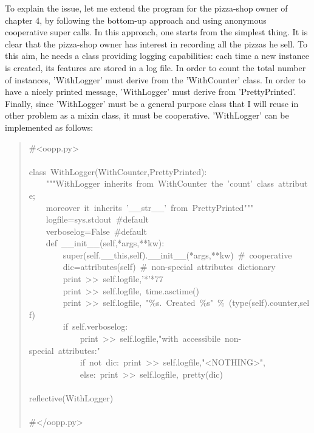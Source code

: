 \documentclass[10pt,english]{article}
\begin{document}
To explain the issue, let me extend the program for the pizza-shop owner of
chapter 4, by following the bottom-up approach and using anonymous
cooperative super calls.
In this approach, one starts from the simplest thing. 
It is clear that the pizza-shop owner has interest in recording all the 
pizzas he sell. 
To this aim, he needs a class providing logging capabilities: 
each time a new instance is created, its features are stored in a log file. In
order to count the total number of instances, 'WithLogger' must derive from
the 'WithCounter' class. In order to have a nicely printed message,
'WithLogger' must derive from 'PrettyPrinted'. Finally, 
since 'WithLogger' must be a general purpose 
class that I will reuse in other problem as a mixin class, it must be 
cooperative. 'WithLogger' can be implemented as follows:
\begin{quote}
\begin{ttfamily}\begin{flushleft}
\mbox{{\#}<oopp.py>}\\
\mbox{}\\
\mbox{class~WithLogger(WithCounter,PrettyPrinted):}\\
\mbox{~~~~"""WithLogger~inherits~from~WithCounter~the~'count'~class~attribute;~}\\
\mbox{~~~~moreover~it~inherits~'{\_}{\_}str{\_}{\_}'~from~PrettyPrinted"""}\\
\mbox{~~~~logfile=sys.stdout~{\#}default}\\
\mbox{~~~~verboselog=False~{\#}default}\\
\mbox{~~~~def~{\_}{\_}init{\_}{\_}(self,*args,**kw):~}\\
\mbox{~~~~~~~~super(self.{\_}{\_}this,self).{\_}{\_}init{\_}{\_}(*args,**kw)~{\#}~cooperative}\\
\mbox{~~~~~~~~dic=attributes(self)~{\#}~non-special~attributes~dictionary}\\
\mbox{~~~~~~~~print~>>~self.logfile,'*'*77}\\
\mbox{~~~~~~~~print~>>~self.logfile,~time.asctime()}\\
\mbox{~~~~~~~~print~>>~self.logfile,~"{\%}s.~Created~{\%}s"~{\%}~(type(self).counter,self)}\\
\mbox{~~~~~~~~if~self.verboselog:}\\
\mbox{~~~~~~~~~~~~print~>>~self.logfile,"with~accessibile~non-special~attributes:"}\\
\mbox{~~~~~~~~~~~~if~not~dic:~print~>>~self.logfile,"<NOTHING>",}\\
\mbox{~~~~~~~~~~~~else:~print~>>~self.logfile,~pretty(dic)}\\
\mbox{}\\
\mbox{reflective(WithLogger)}\\
\mbox{}\\
\mbox{{\#}</oopp.py>}
\end{flushleft}\end{ttfamily}
\end{quote}
\end{document}
